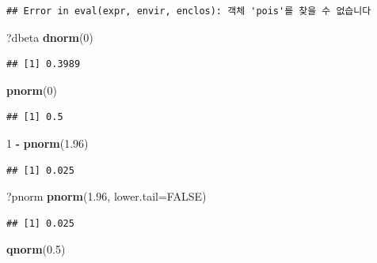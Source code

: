 \documentclass[11pt,]{krantz}
\makeatletter
\newenvironment{Shaded}{\begin{snugshade}}{\end{snugshade}}
\newcommand{\KeywordTok}[1]{\textcolor[rgb]{0.13,0.29,0.53}{\textbf{#1}}}
\newcommand{\DataTypeTok}[1]{\textcolor[rgb]{0.13,0.29,0.53}{#1}}
\newcommand{\DecValTok}[1]{\textcolor[rgb]{0.00,0.00,0.81}{#1}}
\newcommand{\FloatTok}[1]{\textcolor[rgb]{0.00,0.00,0.81}{#1}}
\newcommand{\StringTok}[1]{\textcolor[rgb]{0.31,0.60,0.02}{#1}}
\newcommand{\OtherTok}[1]{\textcolor[rgb]{0.56,0.35,0.01}{#1}}
\newcommand{\OperatorTok}[1]{\textcolor[rgb]{0.81,0.36,0.00}{\textbf{#1}}}
\newcommand{\NormalTok}[1]{#1}
\newenvironment{kframe}{%
\medskip{}
\setlength{\fboxsep}{.8em}
 \def\at@end@of@kframe{}%
 \ifinner\ifhmode%
  \def\at@end@of@kframe{\end{minipage}}%
  \begin{minipage}{\columnwidth}%
 \fi\fi%
 \def\FrameCommand##1{\hskip\@totalleftmargin \hskip-\fboxsep
 \colorbox{shadecolor}{##1}\hskip-\fboxsep
     \hskip-\linewidth \hskip-\@totalleftmargin \hskip\columnwidth}%
 \MakeFramed {\advance\hsize-\width
   \@totalleftmargin\z@ \linewidth\hsize
   \@setminipage}}%
 {\par\unskip\endMakeFramed%
 \at@end@of@kframe}
\renewenvironment{Shaded}{\begin{kframe}}{\end{kframe}}
\theoremstyle{definition}
\theoremstyle{definition}
\theoremstyle{remark}
\makeatother
\begin{document}
\begin{verbatim}
## Error in eval(expr, envir, enclos): 객체 'pois'를 찾을 수 없습니다
\end{verbatim}

\begin{Shaded}
\begin{Highlighting}[]
\NormalTok{?dbeta}
\KeywordTok{dnorm}\NormalTok{(}\DecValTok{0}\NormalTok{)}
\end{Highlighting}
\end{Shaded}

\begin{verbatim}
## [1] 0.3989
\end{verbatim}

\begin{Shaded}
\begin{Highlighting}[]
\KeywordTok{pnorm}\NormalTok{(}\DecValTok{0}\NormalTok{)}
\end{Highlighting}
\end{Shaded}

\begin{verbatim}
## [1] 0.5
\end{verbatim}

\begin{Shaded}
\begin{Highlighting}[]
\DecValTok{1} \OperatorTok{-}\StringTok{ }\KeywordTok{pnorm}\NormalTok{(}\FloatTok{1.96}\NormalTok{)}
\end{Highlighting}
\end{Shaded}

\begin{verbatim}
## [1] 0.025
\end{verbatim}

\begin{Shaded}
\begin{Highlighting}[]
\NormalTok{?pnorm}
\KeywordTok{pnorm}\NormalTok{(}\FloatTok{1.96}\NormalTok{, }\DataTypeTok{lower.tail=}\OtherTok{FALSE}\NormalTok{)}
\end{Highlighting}
\end{Shaded}

\begin{verbatim}
## [1] 0.025
\end{verbatim}

\begin{Shaded}
\begin{Highlighting}[]
\KeywordTok{qnorm}\NormalTok{(}\FloatTok{0.5}\NormalTok{)}
\end{Highlighting}
\end{Shaded}
\end{document}
